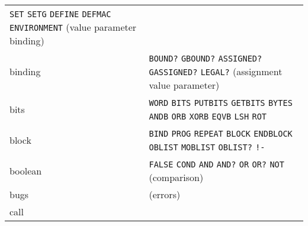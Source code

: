 \documentclass[a4paper,]{article}
\begin{document}
\begin{longtable}[]{@{}ll@{}}
\begin{minipage}[t]{0.83\columnwidth}
\texttt{SET} \texttt{SETG} \texttt{DEFINE} \texttt{DEFMAC} \texttt{ENVIRONMENT} (value parameter binding)\strut
\end{minipage}\tabularnewline
\begin{minipage}[t]{0.11\columnwidth}\raggedright\strut
binding\strut
\end{minipage} & \begin{minipage}[t]{0.83\columnwidth}\raggedright\strut
\texttt{BOUND?} \texttt{GBOUND?} \texttt{ASSIGNED?} \texttt{GASSIGNED?} \texttt{LEGAL?} (assignment value parameter)\strut
\end{minipage}\tabularnewline
\begin{minipage}[t]{0.11\columnwidth}\raggedright\strut
bits\strut
\end{minipage} & \begin{minipage}[t]{0.83\columnwidth}\raggedright\strut
\texttt{WORD} \texttt{BITS} \texttt{PUTBITS} \texttt{GETBITS} \texttt{BYTES} \texttt{ANDB} \texttt{ORB} \texttt{XORB}
\texttt{EQVB} \texttt{LSH} \texttt{ROT}\strut
\end{minipage}\tabularnewline
\begin{minipage}[t]{0.11\columnwidth}\raggedright\strut
block\strut
\end{minipage} & \begin{minipage}[t]{0.83\columnwidth}\raggedright\strut
\texttt{BIND} \texttt{PROG} \texttt{REPEAT} \texttt{BLOCK} \texttt{ENDBLOCK} \texttt{OBLIST} \texttt{MOBLIST}
\texttt{OBLIST?} \texttt{!-}\strut
\end{minipage}\tabularnewline
\begin{minipage}[t]{0.11\columnwidth}\raggedright\strut
boolean\strut
\end{minipage} & \begin{minipage}[t]{0.83\columnwidth}\raggedright\strut
\texttt{FALSE} \texttt{COND} \texttt{AND} \texttt{AND?} \texttt{OR} \texttt{OR?} \texttt{NOT} (comparison)\strut
\end{minipage}\tabularnewline
\begin{minipage}[t]{0.11\columnwidth}\raggedright\strut
bugs\strut
\end{minipage} & \begin{minipage}[t]{0.83\columnwidth}\raggedright\strut
(errors)\strut
\end{minipage}\tabularnewline
\begin{minipage}[t]{0.11\columnwidth}\raggedright\strut
call\strut
\end{minipage} & \begin{minipage}[t]{0.83\columnwidth}\raggedright\strut

\end{minipage}
\end{longtable}
\end{document}
